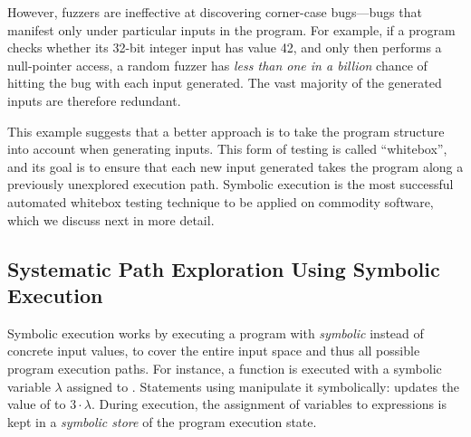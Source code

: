 
However, fuzzers are ineffective at discovering corner-case bugs---bugs that manifest only under particular inputs in the program.
%
For example, if a program checks whether its 32-bit integer input has value 42, and only then performs a null-pointer access, a random fuzzer has \emph{less than one in a billion} chance of hitting the bug with each input generated.
%
The vast majority of the generated inputs are therefore redundant.



This example suggests that a better approach is to take the program structure into account when generating inputs.  This form of testing is called ``whitebox'', and its goal is to ensure that each new input generated takes the program along a previously unexplored execution path.
%
Symbolic execution is the most successful automated whitebox testing technique to be applied on commodity software, which we discuss next in more detail.

\subsection{Systematic Path Exploration Using Symbolic Execution}


Symbolic execution works by executing a program with \emph{symbolic} instead of concrete input values, to cover the entire input space and thus all possible program execution paths.  For instance, a function  is executed with a symbolic variable $\lambda$ assigned to .
%
Statements using  manipulate it symbolically:  updates the value of  to $3 \cdot \lambda$.  During execution, the assignment of variables to expressions is kept in a \emph{symbolic store} of the program execution state.


